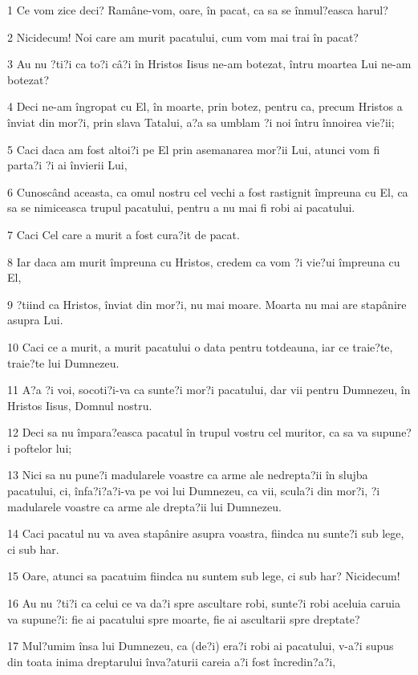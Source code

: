 \par 1 Ce vom zice deci? Ramâne-vom, oare, în pacat, ca sa se înmul?easca harul?
\par 2 Nicidecum! Noi care am murit pacatului, cum vom mai trai în pacat?
\par 3 Au nu ?ti?i ca to?i câ?i în Hristos Iisus ne-am botezat, întru moartea Lui ne-am botezat?
\par 4 Deci ne-am îngropat cu El, în moarte, prin botez, pentru ca, precum Hristos a înviat din mor?i, prin slava Tatalui, a?a sa umblam ?i noi întru înnoirea vie?ii;
\par 5 Caci daca am fost altoi?i pe El prin asemanarea mor?ii Lui, atunci vom fi parta?i ?i ai învierii Lui,
\par 6 Cunoscând aceasta, ca omul nostru cel vechi a fost rastignit împreuna cu El, ca sa se nimiceasca trupul pacatului, pentru a nu mai fi robi ai pacatului.
\par 7 Caci Cel care a murit a fost cura?it de pacat.
\par 8 Iar daca am murit împreuna cu Hristos, credem ca vom ?i vie?ui împreuna cu El,
\par 9 ?tiind ca Hristos, înviat din mor?i, nu mai moare. Moarta nu mai are stapânire asupra Lui.
\par 10 Caci ce a murit, a murit pacatului o data pentru totdeauna, iar ce traie?te, traie?te lui Dumnezeu.
\par 11 A?a ?i voi, socoti?i-va ca sunte?i mor?i pacatului, dar vii pentru Dumnezeu, în Hristos Iisus, Domnul nostru.
\par 12 Deci sa nu împara?easca pacatul în trupul vostru cel muritor, ca sa va supune?i poftelor lui;
\par 13 Nici sa nu pune?i madularele voastre ca arme ale nedrepta?ii în slujba pacatului, ci, înfa?i?a?i-va pe voi lui Dumnezeu, ca vii, scula?i din mor?i, ?i madularele voastre ca arme ale drepta?ii lui Dumnezeu.
\par 14 Caci pacatul nu va avea stapânire asupra voastra, fiindca nu sunte?i sub lege, ci sub har.
\par 15 Oare, atunci sa pacatuim fiindca nu suntem sub lege, ci sub har? Nicidecum!
\par 16 Au nu ?ti?i ca celui ce va da?i spre ascultare robi, sunte?i robi aceluia caruia va supune?i: fie ai pacatului spre moarte, fie ai ascultarii spre dreptate?
\par 17 Mul?umim însa lui Dumnezeu, ca (de?i) era?i robi ai pacatului, v-a?i supus din toata inima dreptarului înva?aturii careia a?i fost încredin?a?i,
